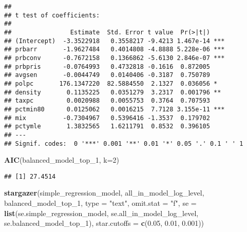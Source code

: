 \documentclass[
]{article}
\newenvironment{Shaded}{\begin{snugshade}}{\end{snugshade}}
\newcommand{\DataTypeTok}[1]{\textcolor[rgb]{0.13,0.29,0.53}{#1}}
\newcommand{\DecValTok}[1]{\textcolor[rgb]{0.00,0.00,0.81}{#1}}
\newcommand{\FloatTok}[1]{\textcolor[rgb]{0.00,0.00,0.81}{#1}}
\newcommand{\KeywordTok}[1]{\textcolor[rgb]{0.13,0.29,0.53}{\textbf{#1}}}
\newcommand{\NormalTok}[1]{#1}
\newcommand{\StringTok}[1]{\textcolor[rgb]{0.31,0.60,0.02}{#1}}
\begin{document}
\begin{verbatim}
## 
## t test of coefficients:
## 
##                Estimate  Std. Error t value  Pr(>|t|)    
## (Intercept)  -3.3522918   0.3558217 -9.4213 1.467e-14 ***
## prbarr       -1.9627484   0.4014808 -4.8888 5.228e-06 ***
## prbconv      -0.7672158   0.1366862 -5.6130 2.846e-07 ***
## prbpris      -0.0764993   0.4732818 -0.1616  0.872005    
## avgsen       -0.0044749   0.0140406 -0.3187  0.750789    
## polpc       176.1347220  82.5884550  2.1327  0.036056 *  
## density       0.1135225   0.0351279  3.2317  0.001796 ** 
## taxpc         0.0020988   0.0055753  0.3764  0.707593    
## pctmin80      0.0125062   0.0016215  7.7128 3.155e-11 ***
## mix          -0.7304967   0.5396416 -1.3537  0.179702    
## pctymle       1.3832565   1.6211791  0.8532  0.396105    
## ---
## Signif. codes:  0 '***' 0.001 '**' 0.01 '*' 0.05 '.' 0.1 ' ' 1
\end{verbatim}

\begin{Shaded}
\begin{Highlighting}[]
\KeywordTok{AIC}\NormalTok{(balanced_model_top_}\DecValTok{1}\NormalTok{, }\DataTypeTok{k=}\DecValTok{2}\NormalTok{)}
\end{Highlighting}
\end{Shaded}

\begin{verbatim}
## [1] 27.4514
\end{verbatim}

\begin{Shaded}
\begin{Highlighting}[]
\KeywordTok{stargazer}\NormalTok{(simple_regression_model, all_in_model_log_level, balanced_model_top_}\DecValTok{1}\NormalTok{,}
          \DataTypeTok{type =} \StringTok{"text"}\NormalTok{, }\DataTypeTok{omit.stat =} \StringTok{"f"}\NormalTok{,}
          \DataTypeTok{se =} \KeywordTok{list}\NormalTok{(se.simple_regression_model, se.all_in_model_log_level, se.balanced_model_top_}\DecValTok{1}\NormalTok{),}
          \DataTypeTok{star.cutoffs =} \KeywordTok{c}\NormalTok{(}\FloatTok{0.05}\NormalTok{, }\FloatTok{0.01}\NormalTok{, }\FloatTok{0.001}\NormalTok{))}
\end{Highlighting}
\end{Shaded}
\end{document}
